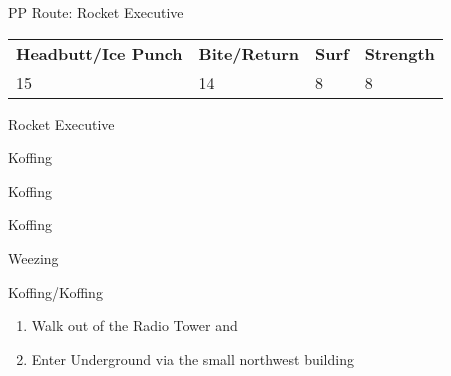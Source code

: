 \begin{paracol}{2}
\switchcolumn*
\begin{misc}{PP Route: Rocket Executive}
	\varwb
	\begin{tabu} to \textwidth {X[6,c] X[5,c] X[4,c] X[4,c]}
		\textbf{Headbutt/Ice Punch} & \textbf{Bite/Return} & \textbf{Surf} & \textbf{Strength}\\ 
		15 & 14 & 8 & 8
	\end{tabu}
	\varwe
\end{misc}

\switchcolumn
\begin{trainer}{Rocket Executive}
	\varwb
	\begin{fightSection}{Koffing}
		\item {} \surf
	\end{fightSection}
	\begin{fightSection}{Koffing}
		\item \xSpecial
		\item {} \bite
	\end{fightSection}
	\begin{fightSection}{Koffing}
		\item {} \bite
	\end{fightSection}
	\begin{fightSection}{Weezing}
		\item {} \surf
	\end{fightSection}
	\begin{fightSection}{Koffing/Koffing}
		\item {}
		\item {} \bite{} 
	\end{fightSection}
	\varwe
\end{trainer}

\begin{enumerate}[resume]
    \item Walk out of the Radio Tower and 
    \item Enter Underground via the small northwest building
\end{enumerate}

\end{paracol}
\vspace{3.5mm}